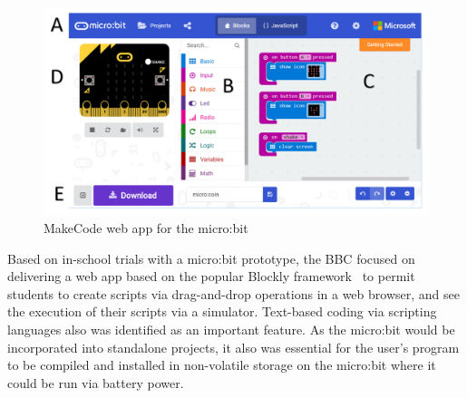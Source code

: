   \begin{figure}[t] 
    \includegraphics[width=6in]{images/webApp.png}
    \caption{\label{fig:snapshot}MakeCode web app for the micro:bit}
\end{figure}

Based on in-school trials with a micro:bit prototype, the BBC focused on delivering a web app 
based on the popular Blockly framework~\cite{Blocky2015} to permit students to
create scripts via drag-and-drop operations in a web browser, and see
the execution of their scripts via a simulator.
Text-based coding via scripting languages also 
was identified as an important feature. As the micro:bit would be incorporated 
into standalone projects, it also was essential for the user's program to be 
compiled and installed in non-volatile storage on the micro:bit where it 
could be run via battery power.



